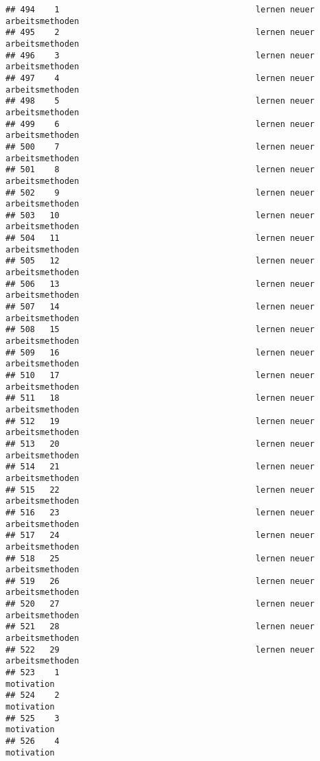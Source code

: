 \documentclass[
]{article}
\begin{document}
\begin{verbatim}
## 494    1                                        lernen neuer arbeitsmethoden
## 495    2                                        lernen neuer arbeitsmethoden
## 496    3                                        lernen neuer arbeitsmethoden
## 497    4                                        lernen neuer arbeitsmethoden
## 498    5                                        lernen neuer arbeitsmethoden
## 499    6                                        lernen neuer arbeitsmethoden
## 500    7                                        lernen neuer arbeitsmethoden
## 501    8                                        lernen neuer arbeitsmethoden
## 502    9                                        lernen neuer arbeitsmethoden
## 503   10                                        lernen neuer arbeitsmethoden
## 504   11                                        lernen neuer arbeitsmethoden
## 505   12                                        lernen neuer arbeitsmethoden
## 506   13                                        lernen neuer arbeitsmethoden
## 507   14                                        lernen neuer arbeitsmethoden
## 508   15                                        lernen neuer arbeitsmethoden
## 509   16                                        lernen neuer arbeitsmethoden
## 510   17                                        lernen neuer arbeitsmethoden
## 511   18                                        lernen neuer arbeitsmethoden
## 512   19                                        lernen neuer arbeitsmethoden
## 513   20                                        lernen neuer arbeitsmethoden
## 514   21                                        lernen neuer arbeitsmethoden
## 515   22                                        lernen neuer arbeitsmethoden
## 516   23                                        lernen neuer arbeitsmethoden
## 517   24                                        lernen neuer arbeitsmethoden
## 518   25                                        lernen neuer arbeitsmethoden
## 519   26                                        lernen neuer arbeitsmethoden
## 520   27                                        lernen neuer arbeitsmethoden
## 521   28                                        lernen neuer arbeitsmethoden
## 522   29                                        lernen neuer arbeitsmethoden
## 523    1                                                          motivation
## 524    2                                                          motivation
## 525    3                                                          motivation
## 526    4                                                          motivation

\end{verbatim}
\end{document}
